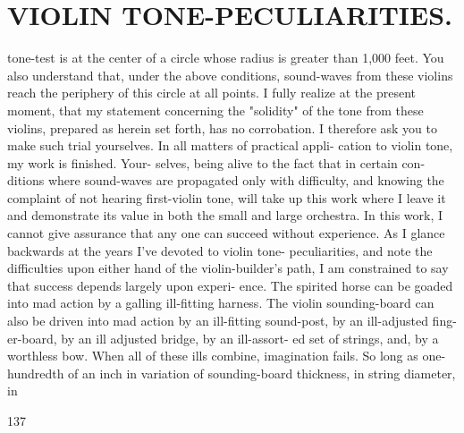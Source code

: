 \documentclass{article}
\begin{document}
\section*{VIOLIN TONE-PECULIARITIES.}
tone-test is at the center of a circle whose radius is greater than 1,000 feet. You also understand that, under the above conditions, sound-waves from these violins reach the periphery of this circle at all points. I fully realize at the present moment, that my statement concerning the "solidity" of the tone from these violins, prepared as herein set forth, has no corrobation. I therefore ask you to make such trial yourselves. In all matters of practical appli- cation to violin tone, my work is finished. Your- selves, being alive to the fact that in certain con- ditions where sound-waves are propagated only with difficulty, and knowing the complaint of not hearing first-violin tone, will take up this work where I leave it and demonstrate its value in both the small and large orchestra. In this work, I cannot give assurance that any one can succeed without experience. As I glance backwards at the years I've devoted to violin tone- peculiarities, and note the difficulties upon either hand of the violin-builder's path, I am constrained to say that success depends largely upon experi- ence. The spirited horse can be goaded into mad action by a galling ill-fitting harness. The violin sounding-board can also be driven into mad action by an ill-fitting sound-post, by an ill-adjusted fing- er-board, by an ill adjusted bridge, by an ill-assort- ed set of strings, and, by a worthless bow. When all of these ills combine, imagination fails. So long as one-hundredth of an inch in variation of sounding-board thickness, in string diameter, in

137
\end{document}
